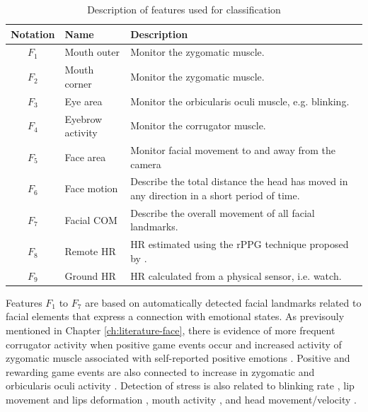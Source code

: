 \begin{table}
    \centering
    \caption{Description of features used for classification}
    \label{table:study5-features-list}
    \begin{tabular}[l]{@{}clp{6.5cm}}
        \hline
            \textbf{Notation} & \textbf{Name} & \textbf{Description} \\
        \hline
            $F_1$ & Mouth outer & Monitor the zygomatic muscle.  \\
            $F_2$ & Mouth corner & Monitor the zygomatic muscle. \\
            $F_3$ & Eye area & Monitor the orbicularis oculi muscle, e.g. blinking. \\
            $F_4$ & Eyebrow activity & Monitor the corrugator muscle.  \\
            $F_5$ & Face area & Monitor facial movement to and away from the camera  \\
            $F_6$ & Face motion & Describe the total distance the head has moved in any direction in a short period of time.  \\
            $F_7$ & Facial COM & Describe the overall movement of all facial landmarks. \\
            $F_8$ & Remote HR & HR estimated using the rPPG technique proposed by \textcite{poh2011advancements}.  \\
            $F_9$ & Ground HR & HR calculated from a physical sensor, i.e. watch. \\
        \hline
    \end{tabular}
\end{table}

Features $F_1$ to $F_7$ are based on automatically detected facial landmarks related to facial elements that express a connection with emotional states. As previsouly mentioned in Chapter \ref{ch:literature-face}, there is evidence of more frequent corrugator activity when positive game events occur \parencite{hazlett2006measuring} and increased activity of zygomatic muscle associated with self-reported positive emotions \parencite{tijs2008dynamic}. Positive and rewarding game events are also connected to increase in zygomatic and orbicularis oculi activity \parencite{ravaja20051}. Detection of stress is also related to blinking rate \parencite{giannakakis2017stress,dinges2005optical}, lip movement \parencite{dinges2005optical} and lips deformation \parencite{metaxas2004image,giannakakis2017stress}, mouth activity \parencite{liao2005decision}, and head movement/velocity \parencite{giannakakis2017stress}.

